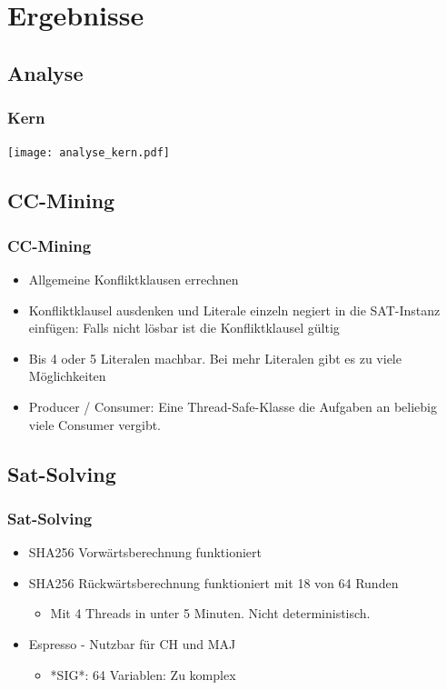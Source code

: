 \documentclass{beamer}
\begin{document}
\section{Ergebnisse}
  \subsection{Analyse}
    \begin{frame}
      \frametitle{Kern}
      \texttt{[image: analyse\_kern.pdf]}
    \end{frame}
  \subsection{CC-Mining}
    \begin{frame}
      \frametitle{CC-Mining}
      \begin{itemize}
       \item Allgemeine Konfliktklausen errechnen
       \item Konfliktklausel ausdenken und Literale einzeln negiert in die SAT-Instanz einfügen: Falls nicht lösbar ist die Konfliktklausel gültig
       \item Bis 4 oder 5 Literalen machbar. Bei mehr Literalen gibt es zu viele Möglichkeiten
       \item Producer / Consumer: Eine Thread-Safe-Klasse die Aufgaben an beliebig viele Consumer vergibt.
      \end{itemize}
    \end{frame}
  \subsection{Sat-Solving}
    \begin{frame}
      \frametitle{Sat-Solving}
      \begin{itemize}
        \item SHA256 Vorwärtsberechnung funktioniert
        \item SHA256 Rückwärtsberechnung \newline funktioniert mit 18 von 64 Runden
        \begin{itemize}
          \item Mit 4 Threads in unter 5 Minuten. Nicht deterministisch.
        \end{itemize}
        \item Espresso - Nutzbar für CH und MAJ
        \begin{itemize}
          \item *SIG*: 64 Variablen: Zu komplex
        \end{itemize}
      \end{itemize}
    \end{frame}
\end{document}

